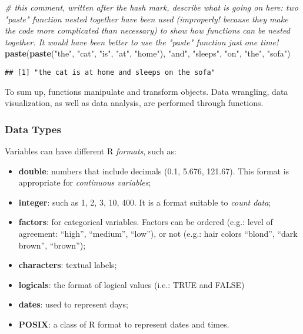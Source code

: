 \documentclass[
]{article}
\newenvironment{Shaded}{\begin{snugshade}}{\end{snugshade}}
\newcommand{\CommentTok}[1]{\textcolor[rgb]{0.56,0.35,0.01}{\textit{#1}}}
\newcommand{\FunctionTok}[1]{\textcolor[rgb]{0.13,0.29,0.53}{\textbf{#1}}}
\newcommand{\NormalTok}[1]{#1}
\newcommand{\StringTok}[1]{\textcolor[rgb]{0.31,0.60,0.02}{#1}}
\providecommand{\tightlist}{%
  \setlength{\itemsep}{0pt}\setlength{\parskip}{0pt}}
\begin{document}
\begin{Shaded}
\begin{Highlighting}[]
\CommentTok{\# this comment, written after the hash mark, describe what is going on here: two "paste" function nested together have been used (improperly! because they make the code more complicated than necessary) to show how functions can be nested together. It would have been better to use the "paste" function just one time!}
\FunctionTok{paste}\NormalTok{(}\FunctionTok{paste}\NormalTok{(}\StringTok{"the"}\NormalTok{, }\StringTok{"cat"}\NormalTok{, }\StringTok{"is"}\NormalTok{, }\StringTok{"at"}\NormalTok{, }\StringTok{"home"}\NormalTok{), }\StringTok{"and"}\NormalTok{, }\StringTok{"sleeps"}\NormalTok{, }\StringTok{"on"}\NormalTok{, }\StringTok{"the"}\NormalTok{, }\StringTok{"sofa"}\NormalTok{)}
\end{Highlighting}
\end{Shaded}

\begin{verbatim}
## [1] "the cat is at home and sleeps on the sofa"
\end{verbatim}

To sum up, functions manipulate and transform objects. Data wrangling, data visualization, as well as data analysis, are performed through functions.

\subsubsection{Data Types}\label{data-types}

Variables can have different R \emph{formats}, such as:

\begin{itemize}
\tightlist
\item
  \textbf{double}: numbers that include decimals (0.1, 5.676, 121.67). This format is appropriate for \emph{continuous variables};
\item
  \textbf{integer}: such as 1, 2, 3, 10, 400. It is a format suitable to \emph{count data};
\item
  \textbf{factors}: for categorical variables. Factors can be ordered (e.g.: level of agreement: ``high'', ``medium'', ``low''), or not (e.g.: hair colors ``blond'', ``dark brown'', ``brown'');
\item
  \textbf{characters}: textual labels;
\item
  \textbf{logicals}: the format of logical values (i.e.: TRUE and FALSE)
\item
  \textbf{dates}: used to represent days;
\item
  \textbf{POSIX}: a class of R format to represent dates and times.
\end{itemize}
\end{document}
